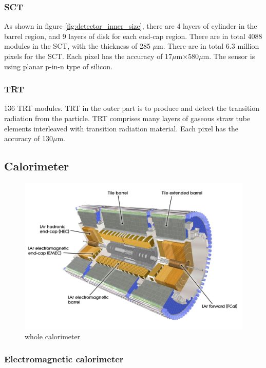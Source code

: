 \subsubsection{SCT}
As shown in figure \ref{fig:detector_inner_size}, there are 4 layers of cylinder in the barrel region, and 9 layers of disk for each end-cap region.
There are in total 4088 modules in the SCT, with the thickness of 285 $\mu$m.
There are in total 6.3 million pixels for the SCT.
Each pixel has the accuracy of 17$\mu$m$\times$580$\mu$m.
The sensor is using planar p-in-n type of silicon.

\subsubsection{TRT}
136 TRT modules.
TRT in the outer part is to produce and detect the transition radiation from the particle. TRT comprises many layers of gaseous straw tube elements interleaved with transition radiation material.
Each pixel has the accuracy of 130$\mu$m.

\subsection{Calorimeter}
\begin{figure}
\centering
\includegraphics[width=\textwidth]{data/photo/calorimeter_whole.jpg}
\caption{whole calorimeter \cite{calorimeter_whole}}
\label{fig:calorimeter_whole}
\end{figure}

\subsubsection{Electromagnetic calorimeter}

